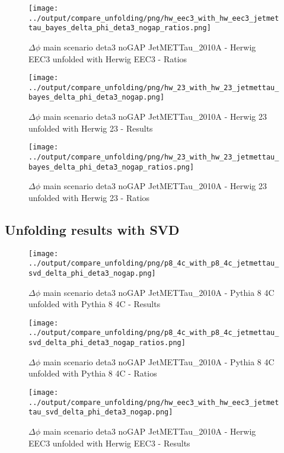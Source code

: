 \documentclass[11pt]{book}
\begin{document}
\begin{figure}[ht]
\centering
\texttt{[image: ../output/compare\_unfolding/png/hw\_eec3\_with\_hw\_eec3\_jetmettau\_bayes\_delta\_phi\_deta3\_nogap\_ratios.png]}
\caption{$\Delta\phi$ main scenario deta3 noGAP JetMETTau\_2010A - Herwig EEC3 unfolded with Herwig EEC3 - Ratios}
\label{hw_eec3_hw_eec3_jetmettau_bayes_delta_phi_deta3_nogap_b}
\end{figure}

\begin{figure}[ht]
\centering
\texttt{[image: ../output/compare\_unfolding/png/hw\_23\_with\_hw\_23\_jetmettau\_bayes\_delta\_phi\_deta3\_nogap.png]}
\caption{$\Delta\phi$ main scenario deta3 noGAP JetMETTau\_2010A - Herwig 23 unfolded with Herwig 23 - Results}
\label{hw_23_hw_23_jetmettau_bayes_delta_phi_deta3_nogap_a}
\end{figure}

\begin{figure}[ht]
\centering
\texttt{[image: ../output/compare\_unfolding/png/hw\_23\_with\_hw\_23\_jetmettau\_bayes\_delta\_phi\_deta3\_nogap\_ratios.png]}
\caption{$\Delta\phi$ main scenario deta3 noGAP JetMETTau\_2010A - Herwig 23 unfolded with Herwig 23 - Ratios}
\label{hw_23_hw_23_jetmettau_bayes_delta_phi_deta3_nogap_b}
\end{figure}

\clearpage
\subsection{Unfolding results with SVD}

\begin{figure}[ht]
\centering
\texttt{[image: ../output/compare\_unfolding/png/p8\_4c\_with\_p8\_4c\_jetmettau\_svd\_delta\_phi\_deta3\_nogap.png]}
\caption{$\Delta\phi$ main scenario deta3 noGAP JetMETTau\_2010A - Pythia 8 4C unfolded with Pythia 8 4C - Results}
\label{p8_p8_jetmettau_svd_delta_phi_deta3_nogap_a}
\end{figure}

\begin{figure}[ht]
\centering
\texttt{[image: ../output/compare\_unfolding/png/p8\_4c\_with\_p8\_4c\_jetmettau\_svd\_delta\_phi\_deta3\_nogap\_ratios.png]}
\caption{$\Delta\phi$ main scenario deta3 noGAP JetMETTau\_2010A - Pythia 8 4C unfolded with Pythia 8 4C - Ratios}
\label{p8_p8_jetmettau_svd_delta_phi_deta3_nogap_b}
\end{figure}

\begin{figure}[ht]
\centering
\texttt{[image: ../output/compare\_unfolding/png/hw\_eec3\_with\_hw\_eec3\_jetmettau\_svd\_delta\_phi\_deta3\_nogap.png]}
\caption{$\Delta\phi$ main scenario deta3 noGAP JetMETTau\_2010A - Herwig EEC3 unfolded with Herwig EEC3 - Results}
\label{hw_eec3_hw_eec3_jetmettau_svd_delta_phi_deta3_nogap_a}
\end{figure}
\end{document}
